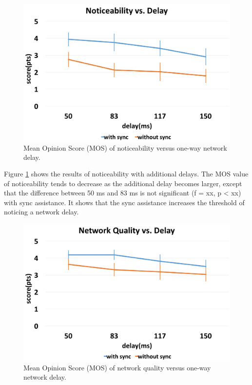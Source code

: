 \begin{figure}[!htbp]
\centering
\includegraphics[width=0.9\linewidth]{figures/figure7_2.jpg}
\setlength{\abovecaptionskip}{0.5cm}
\caption{Mean Opinion Score (MOS) of noticeability versus one-way network delay.}
\label{fig:noticeability}
\end{figure}

Figure \ref{fig:noticeability} shows the results of noticeability with additional delays. The MOS value of noticeability tends to decrease as the additional delay becomes larger, except that the difference between 50 ms and 83 ms is not significant (f = xx, p < xx) with sync assistance. It shows that the sync assistance increases the threshold of noticing a network delay.

\begin{figure}[!htbp]
\centering
\includegraphics[width=0.9\linewidth]{figures/figure7_3.jpg}
\setlength{\abovecaptionskip}{0.5cm}
\caption{Mean Opinion Score (MOS) of network quality versus one-way network delay.}
\label{fig:overall_rating}
\end{figure}

